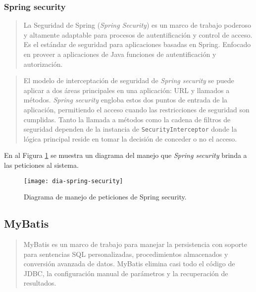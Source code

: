 \subsubsection{Spring security}\label{sec:spring-security}
\begin{quote}
	La Seguridad de Spring (\textit{Spring Security}) es un marco de trabajo poderoso y altamente adaptable para procesos de autentificación y control de acceso. Es el estándar de seguridad para aplicaciones basadas en Spring. Enfocado en proveer a aplicaciones de Java funciones de autentificación y autorización\cite{SpringSecurity}.
\end{quote}

\begin{quote}
	El modelo de interceptación de seguridad de \textit{Spring security} se puede aplicar a dos áreas principales en una aplicación: URL y llamados a métodos. \textit{Spring security} engloba estos dos puntos de entrada de la aplicación, permitiendo el acceso cuando las restricciones de seguridad son cumplidas. Tanto la llamada a métodos como la cadena de filtros de seguridad dependen de la instancia de \texttt{SecurityInterceptor} donde la lógica principal reside en tomar la decisión de conceder o no el acceso\cite{ProSpringSecurity}.
\end{quote}
En al Figura \ref{fig:dia-spring-security} se muestra un diagrama del manejo que \textit{Spring security} brinda a las peticiones al sistema.

\begin{figure}[h]
	\centering
	\texttt{[image: dia-spring-security]}
	\caption{Diagrama de manejo de peticiones de Spring security\cite{ProSpringSecurity}.}
	\label{fig:dia-spring-security}
\end{figure}

\subsection{MyBatis}\label{sec:mybatis}
\begin{quote}
MyBatis es un marco de trabajo para manejar la persistencia con soporte para sentencias SQL personalizadas, procedimientos almacenados y conversión avanzada de datos. MyBatis elimina casi todo el código de JDBC, la configuración manual de parámetros y la recuperación de resultados\cite{MyBatis}.
\end{quote}

